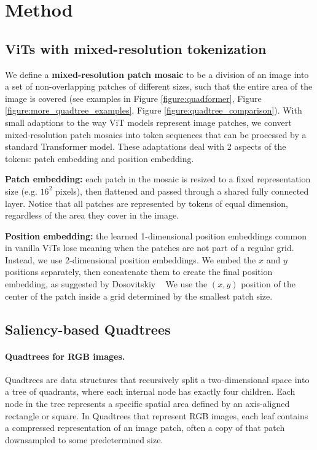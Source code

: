 \section{Method}

\subsection{ViTs with mixed-resolution tokenization}

We define a \textbf{mixed-resolution patch mosaic} to be a division of an image into a set of non-overlapping patches of different sizes, such that the entire area of the image is covered (see examples in Figure \ref{figure:quadformer}, Figure \ref{figure:more_quadtree_examples}, Figure \ref{figure:quadtree_comparison}). With small adaptions to the way ViT models represent image patches, we convert mixed-resolution patch mosaics into token sequences that can be processed by a standard Transformer model. These adaptations deal with 2 aspects of the tokens: patch embedding and position embedding.

\noindent \textbf{Patch embedding:} each patch in the mosaic is resized to a fixed representation size (e.g. $16^2$ pixels), then flattened and passed through a shared fully connected layer. Notice that all patches are represented by tokens of equal dimension, regardless of the area they cover in the image.

\noindent \textbf{Position embedding:} the learned 1-dimensional position embeddings common in vanilla ViTs lose meaning when the patches are not part of a regular grid. Instead, we use 2-dimensional position embeddings. We embed the $x$ and $y$ positions separately, then concatenate them to create the final position embedding, as suggested by Dosovitskiy \etal~\cite{Dosovitskiy2020AnII} We use the $(x,y)$ position of the center of the patch inside a grid determined by the smallest patch size. 




\subsection{Saliency-based Quadtrees}

\paragraph{Quadtrees for RGB images.} Quadtrees are data structures that recursively split a two-dimensional space into a tree of quadrants, where each internal node has exactly four children. Each node in the tree represents a specific spatial area defined by an axis-aligned rectangle or square. In Quadtrees that represent RGB images, each leaf contains a compressed representation of an image patch, often a copy of that patch downsampled to some predetermined size.

